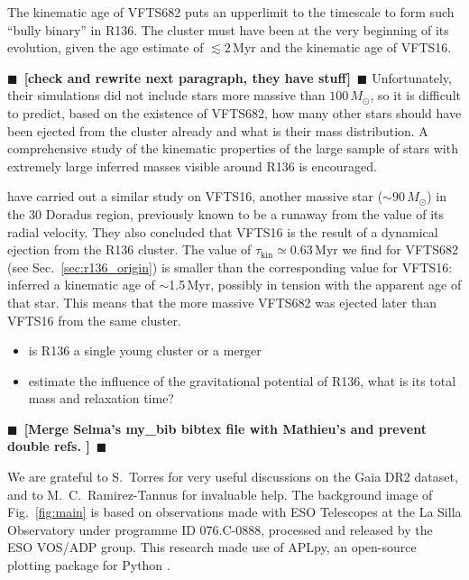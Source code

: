 \documentclass[apjl,twocolumn]{emulateapj}
\newcommand{\todo}[1]{{\large $\blacksquare$~\textbf{\color{red}[#1]}}~$\blacksquare$}
\newcommand{\SdM}[1]{{{\color{Sepia}{#1}}}}
\DeclareRobustCommand{\Figref}[1]{Fig.~\ref{#1}}
\DeclareRobustCommand{\Secref}[1]{Sec.~\ref{#1}}
\begin{document}
The kinematic age of VFTS682 puts an
upperlimit to the timescale to form such ``bully binary'' in
R136. The cluster must have been at the very beginning of its
evolution, given the age estimate of $\lesssim 2$\,Myr
\cite{crowther:10,sabbi:12} and the kinematic age of VFTS16.

\todo{check \cite{banerjee} and rewrite next paragraph, they
  have stuff} Unfortunately, their simulations did not include stars more
massive than $100\,M_\odot$, so it is difficult to predict, based on
the existence of VFTS682, how many other stars should have been
ejected from the cluster already and what is their mass
distribution. A comprehensive study of the kinematic properties of the
large sample of stars with extremely large inferred masses visible
around R136 is encouraged.  

\cite{lennon:18} have carried out a similar study on VFTS16, another
massive star ($\sim90\,M_\odot$) in the 30 Doradus region, previously
known to be a runaway from the value of
its radial velocity. They also concluded that VFTS16 is 
the result of a dynamical ejection from the R136 cluster. 
The value of $\tau_\mathrm{kin}\simeq0.63$\,Myr we find for VFTS682 (see \Secref{sec:r136_origin}) is smaller
than the corresponding value for VFTS16: \cite{lennon:18} inferred a kinematic age of
$\sim$1.5\,Myr, possibly in tension with the apparent age of that star. This means that the more
massive VFTS682 was ejected later than VFTS16 from the same cluster.



\begin{itemize}
\item is R136 a single young cluster or a merger
\item estimate the influence of the gravitational potential of R136,
  what is its total mass and relaxation time?
\end{itemize}


\todo{Merge Selma's my\_bib bibtex file with Mathieu's and prevent double refs. }



\begin{acknowledgements}
  We are grateful to S.~Torres for 
  very useful discussions on the
  Gaia DR2 dataset, and to M.~C.~Ramirez-Tannus for invaluable help.
  \SdM{SdM has received funding under the European Unions Horizon 2020 research and innovation programme from the European Research
Council (ERC) (Grant agreement No. 715063).
   This work has made use of data from the ESA space mission Gaia (http://www.cosmos.esa.int/gaia), processed by the Gaia Data Processing and Analysis Consortium (DPAC, http://www.cosmos.esa.int/web/gaia/dpac/consortium). Funding for the DPAC has been provided by national institutions, in particular the institutions participating in the Gaia Multilateral Agreement. }
  The background image of \Figref{fig:main} is based on observations
  made with ESO Telescopes at the La Silla Observatory under programme
  ID 076.C-0888, processed and released by the ESO VOS/ADP group.
  This research made use of APLpy, an open-source plotting package for Python \citep[][]{robitaille:12}.
\end{acknowledgements}
\end{document}
